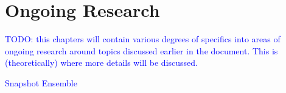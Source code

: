 \chapter{Ongoing Research}

\textcolor{blue}{TODO: this chapters will contain various degrees of specifics into areas of ongoing research around topics discussed earlier in the document. This is (theoretically) where more details will be discussed.}

\textcolor{blue}{Snapshot Ensemble~\cite{huang2017snapshot}}








